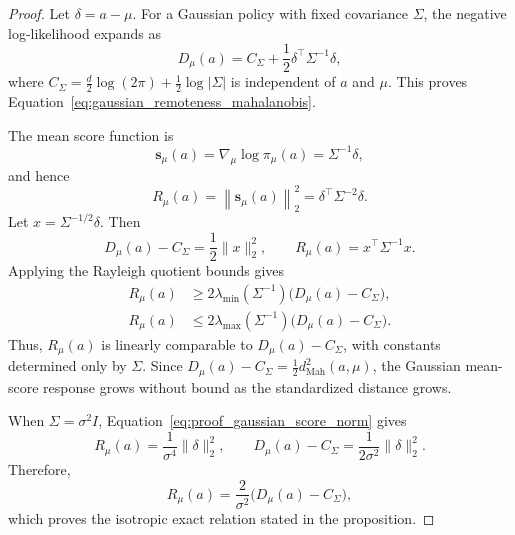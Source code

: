 \documentclass{article}
\theoremstyle{plain}
\theoremstyle{definition}
\theoremstyle{remark}
\begin{document}
\begin{proof}
Let \(\delta=a-\mu\). For a Gaussian policy with fixed covariance
\(\Sigma\), the negative log-likelihood expands as
\[
    D_\mu(a)
    =
    C_\Sigma
    +
    \frac{1}{2}
    \delta^\top\Sigma^{-1}\delta,
\]
where
\(C_\Sigma=\frac{d}{2}\log(2\pi)+\frac{1}{2}\log|\Sigma|\)
is independent of \(a\) and \(\mu\). This proves
Equation~\eqref{eq:gaussian_remoteness_mahalanobis}.

The mean score function is
\begin{equation}
    \mathbf{s}_\mu(a)
    =
    \nabla_\mu\log\pi_\mu(a)
    =
    \Sigma^{-1}\delta,
\end{equation}
and hence
\begin{equation}
    R_\mu(a)
    =
    \left\|\mathbf{s}_\mu(a)\right\|_2^2
    =
    \delta^\top\Sigma^{-2}\delta.
    \label{eq:proof_gaussian_score_norm}
\end{equation}
Let \(x=\Sigma^{-1/2}\delta\). Then
\begin{equation}
    D_\mu(a)-C_\Sigma
    =
    \frac{1}{2}\|x\|_2^2,
    \qquad
    R_\mu(a)
    =
    x^\top\Sigma^{-1}x.
\end{equation}
Applying the Rayleigh quotient bounds gives
\begin{equation}
\begin{aligned}
    R_\mu(a)
    &\geq
    2\lambda_{\min}(\Sigma^{-1})
    \bigl(D_\mu(a)-C_\Sigma\bigr), \\
    R_\mu(a)
    &\leq
    2\lambda_{\max}(\Sigma^{-1})
    \bigl(D_\mu(a)-C_\Sigma\bigr).
\end{aligned}
\label{eq:proof_gaussian_score_remoteness_bounds}
\end{equation}
Thus, \(R_\mu(a)\) is linearly comparable to
\(D_\mu(a)-C_\Sigma\), with constants determined only by \(\Sigma\).
Since \(D_\mu(a)-C_\Sigma=\frac12 d_{\mathrm{Mah}}^2(a,\mu)\),
the Gaussian mean-score response grows without bound as the standardized
distance grows.

When \(\Sigma=\sigma^2I\), Equation~\eqref{eq:proof_gaussian_score_norm}
gives
\[
    R_\mu(a)
    =
    \frac{1}{\sigma^4}\|\delta\|_2^2,
    \qquad
    D_\mu(a)-C_\Sigma
    =
    \frac{1}{2\sigma^2}\|\delta\|_2^2.
\]
Therefore,
\[
    R_\mu(a)
    =
    \frac{2}{\sigma^2}
    \bigl(D_\mu(a)-C_\Sigma\bigr),
\]
which proves the isotropic exact relation stated in the proposition.


\end{proof}
\end{document}
